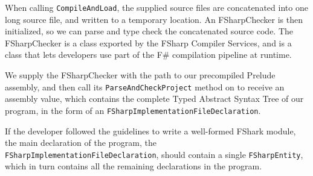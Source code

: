 When calling \texttt{CompileAndLoad}, the supplied \fshark{} source files are
concatenated into one long source file, and written to a temporary location.
An FSharpChecker is then initialized, so we can parse and type check the
concatenated source code. The FSharpChecker is a class exported by the FSharp
Compiler Services, and is a class that lets developers use part of the F\#
compilation pipeline at runtime.

We supply the FSharpChecker with the path to our precompiled \fshark{}Prelude
assembly, and then call its \texttt{ParseAndCheckProject} method on to receive
an assembly value, which contains the complete Typed Abstract Syntax Tree of our
\fshark{} program, in the form of an \texttt{FSharpImplementationFileDeclaration}.

If the \fshark{} developer followed the guidelines to write a well-formed FShark
module, the main declaration of the program, the
\texttt{FSharpImplementationFileDeclaration}, should contain a single
\texttt{FSharpEntity}, which in turn contains all the remaining declarations in
the program.

